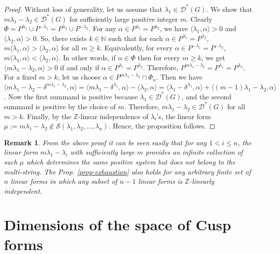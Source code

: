 \documentclass[11 pt]{amsart}
\newcommand{\Z}{{\mathbb Z}}
\newcommand{\N}{{\mathbb N}}
\theoremstyle{definition}
\newtheorem{remark}{Remark}[section]
\numberwithin{equation}{section}
\begin{document}
\begin{proof}
Without loss of generality, let us assume that $\lambda_1 \in \mathcal{D^*}(G)$. We show that $m \lambda_1 - \lambda_2 \in \mathcal{D^*}(G)$ for sufficiently large positive integer $m$. Clearly $\Phi = P^{\lambda_1} \cup P^{-\lambda_1} = P^{\lambda_2} \cup P^{-\lambda_2}$. For any $\alpha \in P^{\lambda_1}=P^{\lambda_2}$, we have $\langle \lambda_1 , \alpha \rangle > 0$ and $\langle \lambda_2 , \alpha \rangle > 0$. So, there exists $k \in \N$ such that for each $\alpha \in P^{\lambda_1}=P^{\lambda_2}$, $m \langle \lambda_1 , \alpha \rangle > \langle \lambda_2 , \alpha \rangle$ for all $m \geq k$. Equivalently, for every $\alpha \in P^{-\lambda_1} =P^{-\lambda_2}$, $m \langle \lambda_1 , \alpha \rangle < \langle \lambda_2 , \alpha \rangle$. In other words, if $\alpha \in \Phi$ then for every $m \geq k$, we get $\langle m \lambda_1 - \lambda_2, \alpha \rangle > 0$ if and only if $\alpha \in P^{\lambda_1}=P^{\lambda_2}$. Therefore, $P^{m \lambda_1 - \lambda_2}=P^{\lambda_1}=P^{\lambda_2}$. For a fixed $m > k$, let us choose $\alpha \in P^{m \lambda_1 - \lambda_2} \cap \Phi_n$. Then we have $\langle m \lambda_1 - \lambda_2 - \delta^{m \lambda_1 - \lambda_2} , \alpha \rangle = \langle m \lambda_1 - \delta^{\lambda_1}, \alpha \rangle - \langle \lambda_2 , \alpha \rangle = \langle \lambda_1 - \delta^{\lambda_1} , \alpha \rangle + \langle (m-1) \lambda_1 - \lambda_2 , \alpha \rangle$. Now the first summand is positive because $\lambda_1 \in \mathcal{D^*}(G)$, and the second summand is positive by the choice of $m$. Therefore, $m \lambda_1 - \lambda_2 \in \mathcal{D^*}(G)$ for all $m >k$. Finally, by the $\Z$-linear independence of $\lambda_i$'s, the linear form $\mu:= m \lambda_1 - \lambda_2 \notin \mathcal{S}(\lambda_1, \lambda_2, \dots, \lambda_n)$. Hence, the proposition follows. 
\end{proof}


\begin{remark}
\textit{From the above proof it can be seen easily that for any $1 < i \leq n$, the linear form $m \lambda_1 - \lambda_i$ with sufficiently large $m$   provides an infinite collection of such $\mu$ which determines the same positive system but does not belong to the multi-string. The Prop. \ref{prop-exhaustion} also holds for any arbitrary finite set of $n$ linear forms in which any subset of $n-1$ linear forms is $\Z$-linearly independent.}
\end{remark}



\section{Dimensions of the space of Cusp forms}\label{sec-5}
\end{document}
